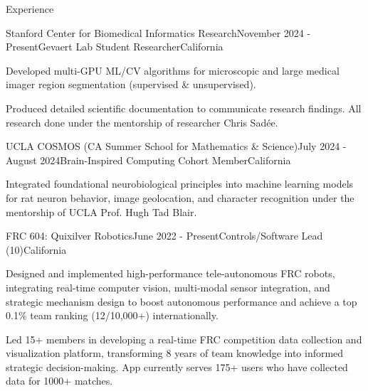 \documentclass[
  11pt, %
]{resume}
\begin{document}
\sloppy


\begin{rSection}{Experience}


  \begin{rSubsection}{Stanford Center for Biomedical Informatics Research}{November 2024 - Present}{Gevaert Lab Student Researcher}{California}
    
    \item Developed multi-GPU ML/CV algorithms for microscopic and large medical imager region segmentation (supervised \& unsupervised).
    
    \item Produced detailed scientific documentation to communicate research findings. All research done under the mentorship of researcher Chris Sadée.
    
  \end{rSubsection}
        
  \begin{rSubsection}{UCLA COSMOS (CA Summer School for Mathematics \& Science)}{July 2024 - August 2024}{Brain-Inspired Computing Cohort Member}{California}
    
    \item Integrated foundational neurobiological principles into machine learning models for rat neuron behavior, image geolocation, and character recognition under the mentorship of UCLA Prof. Hugh Tad Blair.
    
  \end{rSubsection}
        
  \begin{rSubsection}{FRC 604: Quixilver Robotics}{June 2022 - Present}{Controls/Software Lead (10)}{California}
    
    \item Designed and implemented high-performance tele-autonomous FRC robots, integrating real-time computer vision, multi-modal sensor integration, and strategic mechanism design to boost autonomous performance and achieve a top 0.1\% team ranking (12/10,000+) internationally.
    
    \item Led 15+ members in developing a real-time FRC competition data collection and visualization platform, transforming 8 years of team knowledge into informed strategic decision-making. App currently serves 175+ users who have collected data for 1000+ matches.
    
  \end{rSubsection}
        
	
\end{rSection}
\end{document}
